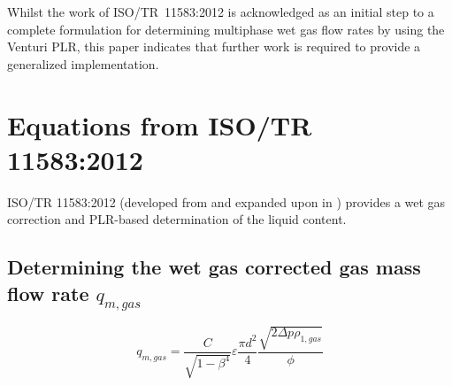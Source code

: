 \documentclass[journal]{IEEEtran}
\begin{document}
Whilst the work of ISO/TR~11583:2012 \cite{2012ISO/TRConduits} is acknowledged as an initial step to a complete formulation for determining multiphase wet gas flow rates by using the Venturi \acrfull{PLR}, this paper indicates that further work is required to provide a generalized implementation.




\vfill\eject

%
\appendices
\section{Equations from ISO/TR 11583:2012} \label{11583 Equations}

ISO/TR 11583:2012\cite{2012ISO/TRConduits} (developed from \cite{Reader-Harris2009} and expanded upon in \cite{Reader-Harris2015}) provides a wet gas correction and \acrshort{PLR}-based determination of the liquid content.

\subsection{Determining the wet gas corrected gas mass flow rate $q_{m,gas}$}

\begin{equation}
    q_{m,gas} = \frac{C}{\sqrt{1-\beta^{4}}}\varepsilon\frac{\pi d^{2}}{4}\frac{\sqrt{2\Delta p \rho_{1,gas}}}{\phi}
\end{equation}
\end{document}
